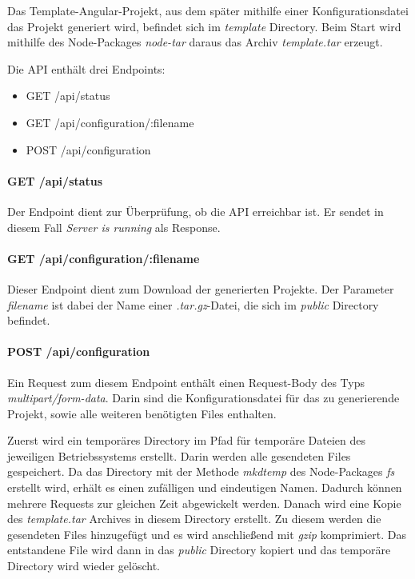 Das Template-Angular-Projekt, aus dem später mithilfe einer Konfigurationsdatei das Projekt generiert wird,
befindet sich im \textit{template} Directory.
Beim Start wird mithilfe des Node-Packages \textit{node-tar} daraus das Archiv \textit{template.tar} erzeugt.

Die API enthält drei Endpoints:

\begin{itemize}
    \item GET /api/status
    \item GET /api/configuration/:filename
    \item POST /api/configuration
\end{itemize}

\paragraph{GET /api/status}
Der Endpoint dient zur Überprüfung, ob die API erreichbar ist.
Er sendet in diesem Fall \textit{Server is running} als Response.

\paragraph{GET /api/configuration/:filename}
Dieser Endpoint dient zum Download der generierten Projekte.
Der Parameter \textit{filename} ist dabei der Name einer \textit{.tar.gz}-Datei, die sich im \textit{public}
Directory befindet.

\paragraph{POST /api/configuration}
Ein Request zum diesem Endpoint enthält einen Request-Body des Typs
\textit{multipart/form-data}.
Darin sind die Konfigurationsdatei für das zu generierende Projekt, sowie alle weiteren benötigten Files enthalten.

Zuerst wird ein temporäres Directory im Pfad für temporäre Dateien des jeweiligen Betriebssystems erstellt.
Darin werden alle gesendeten Files gespeichert.
Da das Directory mit der Methode \textit{mkdtemp} des Node-Packages \textit{fs} erstellt wird, erhält es einen
zufälligen und eindeutigen Namen.
Dadurch können mehrere Requests zur gleichen Zeit abgewickelt werden.
Danach wird eine Kopie des \textit{template.tar} Archives in diesem Directory erstellt.
Zu diesem werden die gesendeten Files hinzugefügt und es wird anschließend mit \textit{gzip} komprimiert.
Das entstandene File wird dann in das \textit{public} Directory kopiert und das temporäre Directory wird wieder gelöscht.

